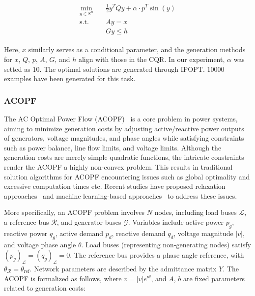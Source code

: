 \begin{align}  
\begin{aligned}
\min_{y\in \mathbb{R}^n}\quad & \frac{1}{2}y^TQy + \alpha\cdot p^T\sin(y)\\  
\mathrm{s.t.}   \quad & Ay = x\\  
                      & Gy \leq h  
\end{aligned}
\end{align}  

Here, \( x \) similarly serves as a conditional parameter, and the generation methods for \( x \), \( Q \), \( p \), \( A \), \( G \), and \( h \) align with those in the CQR.  In our experiment, \(\alpha\) was setted as \(10\). The optimal solutions are generated through \(\text{IPOPT}\). \(10000\) examples have been generated for this task.

\subsubsection{ACOPF}  
\label{appendix:exper-opf}

The AC Optimal Power Flow (ACOPF)~\cite{cain2012history, shi2017global,shi2018global} is a core problem in power systems, aiming to minimize generation costs by adjusting active/reactive power outputs of generators, voltage magnitudes, and phase angles while satisfying constraints such as power balance, line flow limits, and voltage limits. Although the generation costs are merely simple quadratic functions, the intricate constraints render the ACOPF a highly non-convex problem. This results in traditional solution algorithms for ACOPF encountering issues such as global optimality and excessive computation times etc. Recent studies have proposed relaxation approaches~\cite{8392367} and machine learning-based approaches~\cite{9303008,10012237,jiang2024advancements, zhao2024synergizingmachinelearningacopf} to address these issues.

More specifically, an ACOPF problem involves \( N \) nodes, including load buses \( \mathcal{L} \), a reference bus \( \mathcal{R} \), and generator buses \( \mathcal{G} \). Variables include active power \( p_g \), reactive power \( q_g \), active demand \( p_d \), reactive demand \( q_d \), voltage magnitude \( |v| \), and voltage phase angle \( \theta \). Load buses (representing non-generating nodes) satisfy \( (p_g)_{\mathcal{L}} = (q_g)_{\mathcal{L}} = 0 \). The reference bus provides a phase angle reference, with \( \theta_{\mathcal{R}} = \theta_{\text{ref}} \). Network parameters are described by the admittance matrix \( Y \). The ACOPF is formalized as follows, where \( v = |v|e^{i\theta} \), and \( A \), \( b \) are fixed parameters related to generation costs:  

